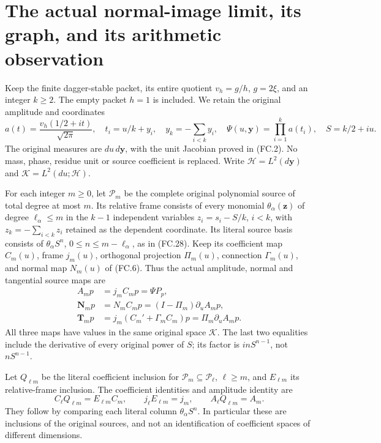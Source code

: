 \section{The actual normal-image limit, its graph, and its arithmetic observation}
\label{sec:nested-normal-observation}

Keep the finite dagger-stable packet, its entire quotient
\(v_h=g/h\), \(g=2\xi\), and an integer \(k\ge2\). The empty
packet \(h=1\) is included. We retain the original amplitude and coordinates
\[
 a(t)=\frac{v_h(1/2+it)}{\sqrt{2\pi}},\quad
 t_i=u/k+y_i,\quad y_k=-\sum_{i<k}y_i,\quad
 \Psi(u,\mathbf y)=\prod_{i=1}^k a(t_i),\quad S=k/2+iu.
 \tag{NN.1}
\]
The original measures are \(du\,d\mathbf y\), with the unit Jacobian
proved in (FC.2). No mass, phase, residue unit or source coefficient
is replaced. Write \(\mathscr H=L^2(d\mathbf y)\) and
\(\mathscr K=L^2(du;\mathscr H)\).

For each integer \(m\ge0\), let \(\mathcal P_m\) be the complete
original polynomial source of total degree at most \(m\). Its relative
frame consists of every monomial \(\theta_\alpha(\mathbf z)\) of degree
\(\ell_\alpha\le m\) in the \(k-1\) independent variables
\(z_i=s_i-S/k\), \(i<k\), with
\(z_k=-\sum_{i<k}z_i\) retained as the dependent coordinate. Its literal source
basis consists of \(\theta_\alpha S^n\),
\(0\le n\le m-\ell_\alpha\), as in (FC.28). Keep its coefficient
map \(C_m(u)\), frame \(j_m(u)\), orthogonal projection \(\Pi_m(u)\),
connection \(\Gamma_m(u)\), and normal map \(N_m(u)\) of (FC.6).
Thus the actual amplitude, normal and tangential source maps are
\[
 \begin{aligned}
 A_m p&=j_m C_m p=\Psi P_p,\\
 \boldsymbol N_m p&=N_m C_m p=(I-\Pi_m)\partial_u A_m p,\\
 \boldsymbol T_m p&=j_m(C_m'+\Gamma_m C_m)p
                         =\Pi_m\partial_u A_m p.
 \end{aligned}
 \tag{NN.2}
\]
All three maps have values in the same original space \(\mathscr K\).
The last two equalities include the derivative of every original power
of \(S\); its factor is \(inS^{n-1}\), not \(nS^{n-1}\).

Let \(Q_{\ell m}\) be the literal coefficient inclusion for
\(\mathcal P_m\subseteq\mathcal P_\ell\), \(\ell\ge m\), and
\(E_{\ell m}\) its relative-frame inclusion. The coefficient identities
and amplitude identity are
\[
 C_\ell Q_{\ell m}=E_{\ell m}C_m,\qquad
 j_\ell E_{\ell m}=j_m,\qquad A_\ell Q_{\ell m}=A_m.
 \tag{NN.3}
\]
They follow by comparing each literal column \(\theta_\alpha S^n\).
In particular these are inclusions of the original sources, and not
an identification of coefficient spaces of different dimensions.

